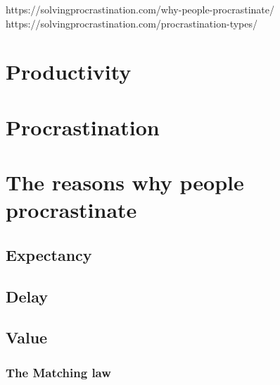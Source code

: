https://solvingprocrastination.com/why-people-procrastinate/
https://solvingprocrastination.com/procrastination-types/


\section{Productivity}




\section{Procrastination}



\section{The reasons why people procrastinate}


\subsection{Expectancy}


\subsection{Delay}


\subsection{Value}


\subsubsection{The Matching law}



